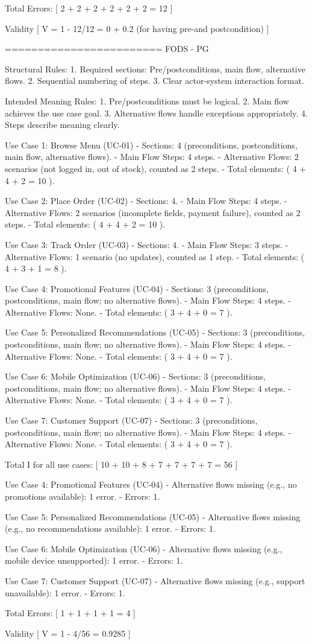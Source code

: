 Total Errors:
[
2 + 2 + 2 + 2 + 2 + 2 = 12
]

Validity
[
V = 1 - 12/12 = 0 + 0.2 (for having pre-and postcondition)
]

========================
FODS - PG

Structural Rules:
1. Required sections: Pre/postconditions, main flow, alternative flows.
2. Sequential numbering of steps.
3. Clear actor-system interaction format.

Intended Meaning Rules:
1. Pre/postconditions must be logical.
2. Main flow achieves the use case goal.
3. Alternative flows handle exceptions appropriately.
4. Steps describe meaning clearly.

Use Case 1: Browse Menu (UC-01)
- Sections: 4 (preconditions, postconditions, main flow, alternative flows).
- Main Flow Steps: 4 steps.
- Alternative Flows: 2 scenarios (not logged in, out of stock), counted as 2 steps.
- Total elements: ( 4 + 4 + 2 = 10 ).

Use Case 2: Place Order (UC-02)
- Sections: 4.
- Main Flow Steps: 4 steps.
- Alternative Flows: 2 scenarios (incomplete fields, payment failure), counted as 2 steps.
- Total elements: ( 4 + 4 + 2 = 10 ).

Use Case 3: Track Order (UC-03)
- Sections: 4.
- Main Flow Steps: 3 steps.
- Alternative Flows: 1 scenario (no updates), counted as 1 step.
- Total elements: ( 4 + 3 + 1 = 8 ).

Use Case 4: Promotional Features (UC-04)
- Sections: 3 (preconditions, postconditions, main flow; no alternative flows).
- Main Flow Steps: 4 steps.
- Alternative Flows: None.
- Total elements: ( 3 + 4 + 0 = 7 ).

Use Case 5: Personalized Recommendations (UC-05)
- Sections: 3 (preconditions, postconditions, main flow; no alternative flows).
- Main Flow Steps: 4 steps.
- Alternative Flows: None.
- Total elements: ( 3 + 4 + 0 = 7 ).

Use Case 6: Mobile Optimization (UC-06)
- Sections: 3 (preconditions, postconditions, main flow; no alternative flows).
- Main Flow Steps: 4 steps.
- Alternative Flows: None.
- Total elements: ( 3 + 4 + 0 = 7 ).

Use Case 7: Customer Support (UC-07)
- Sections: 3 (preconditions, postconditions, main flow; no alternative flows).
- Main Flow Steps: 4 steps.
- Alternative Flows: None.
- Total elements: ( 3 + 4 + 0 = 7 ).

Total I for all use cases:
[
10 + 10 + 8 + 7 + 7 + 7 + 7 = 56
]

Use Case 4: Promotional Features (UC-04)
- Alternative flows missing (e.g., no promotions available): 1 error.
- Errors: 1.

Use Case 5: Personalized Recommendations (UC-05)
- Alternative flows missing (e.g., no recommendations available): 1 error.
- Errors: 1.

Use Case 6: Mobile Optimization (UC-06)
- Alternative flows missing (e.g., mobile device unsupported): 1 error.
- Errors: 1.

Use Case 7: Customer Support (UC-07)
- Alternative flows missing (e.g., support unavailable): 1 error.
- Errors: 1.

Total Errors:
[
1 + 1 + 1 + 1 = 4
]

Validity
[
V = 1 - 4/56 = 0.9285
]